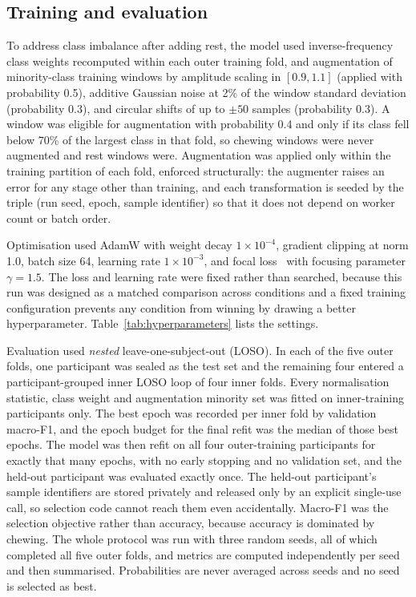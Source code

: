 \documentclass[pdflatex,sn-nature,iicol]{sn-jnl}
\begin{document}
\subsection{Training and evaluation}
\label{sec:training}

To address class imbalance after adding rest, the model used inverse-frequency class weights recomputed within each outer training fold, and augmentation of minority-class training windows by amplitude scaling in $[0.9, 1.1]$ (applied with probability 0.5), additive Gaussian noise at 2\% of the window standard deviation (probability 0.3), and circular shifts of up to $\pm50$ samples (probability 0.3). A window was eligible for augmentation with probability 0.4 and only if its class fell below 70\% of the largest class in that fold, so chewing windows were never augmented and rest windows were. Augmentation was applied only within the training partition of each fold, enforced structurally: the augmenter raises an error for any stage other than training, and each transformation is seeded by the triple (run seed, epoch, sample identifier) so that it does not depend on worker count or batch order.

Optimisation used AdamW with weight decay $1\times10^{-4}$, gradient clipping at norm 1.0, batch size 64, learning rate $1\times10^{-3}$, and focal loss~\cite{lin2017focal} with focusing parameter $\gamma = 1.5$. The loss and learning rate were fixed rather than searched, because this run was designed as a matched comparison across conditions and a fixed training configuration prevents any condition from winning by drawing a better hyperparameter. Table~\ref{tab:hyperparameters} lists the settings.

Evaluation used \emph{nested} leave-one-subject-out (LOSO). In each of the five outer folds, one participant was sealed as the test set and the remaining four entered a participant-grouped inner LOSO loop of four inner folds. Every normalisation statistic, class weight and augmentation minority set was fitted on inner-training participants only. The best epoch was recorded per inner fold by validation macro-F1, and the epoch budget for the final refit was the median of those best epochs. The model was then refit on all four outer-training participants for exactly that many epochs, with no early stopping and no validation set, and the held-out participant was evaluated exactly once. The held-out participant's sample identifiers are stored privately and released only by an explicit single-use call, so selection code cannot reach them even accidentally. Macro-F1 was the selection objective rather than accuracy, because accuracy is dominated by chewing. The whole protocol was run with three random seeds, all of which completed all five outer folds, and metrics are computed independently per seed and then summarised. Probabilities are never averaged across seeds and no seed is selected as best.
\end{document}
